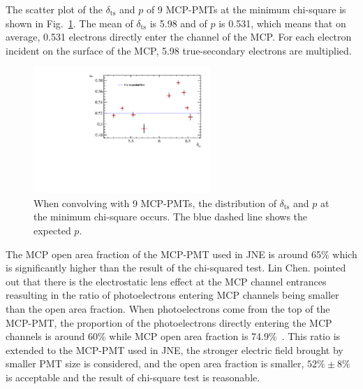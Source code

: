 The scatter plot of the $\delta_{\mathrm{ts}}$ and $p$ of 9 MCP-PMTs at the minimum
chi-square is shown in Fig.~\ref{fig:true_p}. The mean of $\delta_{\mathrm{ts}}$
is 5.98 and of $p$ is 0.531, which means that on average,
0.531 electrons directly enter the channel of the MCP.
For each electron incident on the surface of the MCP,
5.98 true-secondary electrons are multiplied.
\begin{figure}[H]
    \centering
    \includegraphics[width=0.6\textwidth]{pic/true_p.pdf}
    \caption{When convolving with 9 MCP-PMTs,
        the distribution of $\delta_{\mathrm{ts}}$ and $p$ at the minimum chi-square
        occurs. The blue dashed line shows the expected $p$.}
    \label{fig:true_p}
\end{figure}

The MCP open area fraction of the MCP-PMT used in JNE is around 65\%
which is significantly higher than the result of the chi-squared test.
Lin Chen. pointed out that there is the electrostatic lens effect at the MCP channel entrances
reasulting in the ratio of photoelectrons entering MCP channels
being smaller than the open area fraction.
When photoelectrons come from the top of the MCP-PMT,
the proportion of the photoelectrons directly entering the MCP channels is around 60\%
while MCP open area fraction is 74.9\%~\cite{2016Optimization}.
This ratio is extended to the MCP-PMT used in JNE,
the stronger electric field brought by smaller PMT size is considered,
and the open area fraction is smaller, $52\%\pm8\%$ is acceptable and the result of chi-square test is reasonable.
